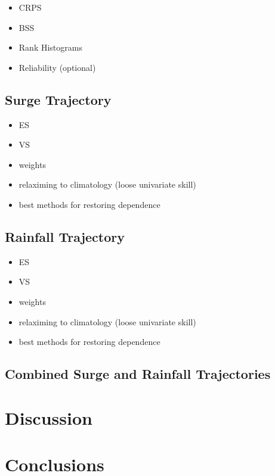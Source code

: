 \documentclass[]{article}
\begin{document}
\begin{itemize}
\item
  CRPS
\item
  BSS
\item
  Rank Histograms
\item
  Reliability (optional)
\end{itemize}

\subsection{Surge Trajectory}\label{surge-trajectory}

\begin{itemize}
\item
  ES
\item
  VS
\item
  weights
\item
  relaximing to climatology (loose univariate skill)
\item
  best methods for restoring dependence
\end{itemize}

\subsection{Rainfall Trajectory}\label{rainfall-trajectory}

\begin{itemize}
\item
  ES
\item
  VS
\item
  weights
\item
  relaximing to climatology (loose univariate skill)
\item
  best methods for restoring dependence
\end{itemize}

\subsection{Combined Surge and Rainfall
Trajectories}\label{combined-surge-and-rainfall-trajectories}

\section{Discussion}\label{discussion}

\section{Conclusions}\label{conclusions}
\end{document}

